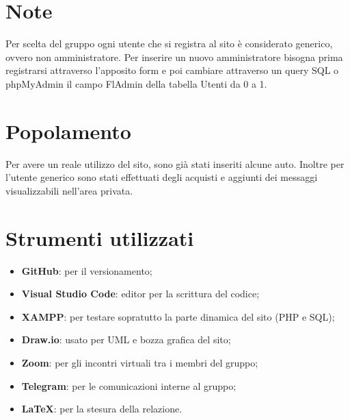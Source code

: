 \appendix
    \section{Note}
    Per scelta del gruppo ogni utente che si registra al sito è considerato generico, ovvero non amministratore. Per inserire un nuovo amministratore bisogna prima registrarsi attraverso l'apposito form e poi cambiare attraverso un query SQL o phpMyAdmin il campo FlAdmin della tabella Utenti da 0 a 1.

    \section{Popolamento}
    Per avere un reale utilizzo del sito, sono già stati inseriti alcune auto. Inoltre per l'utente generico sono stati effettuati degli acquisti e aggiunti dei messaggi visualizzabili nell'area privata.

    \section{Strumenti utilizzati}
    \begin{itemize}
        \item \textbf{GitHub}: per il versionamento; 
        \item \textbf{Visual Studio Code}: editor per la scrittura del codice; 
        \item \textbf{XAMPP}: per testare sopratutto la parte dinamica del sito (PHP e SQL);
        \item \textbf{Draw.io}: usato per UML e bozza grafica del sito;
        \item \textbf{Zoom}: per gli incontri virtuali tra i membri del gruppo;
        \item \textbf{Telegram}: per le comunicazioni interne al gruppo;
        \item \textbf{\LaTeX}: per la stesura della relazione.
    \end{itemize}
\pagebreak